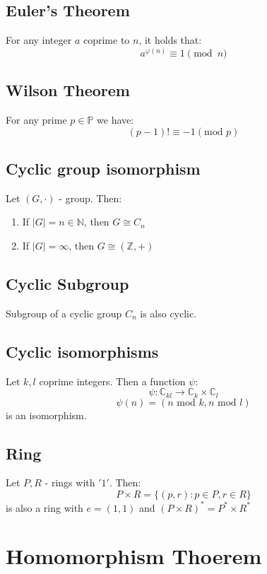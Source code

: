 \documentclass{article}
\begin{document}
\subsection{Euler's Theorem}

For any integer \( a \) coprime to \( n \), it holds that:
\[ a^{\varphi(n)} \equiv 1 \pmod{n} \]

\subsection{Wilson Theorem}

For any prime \(p\in\mathbb{P}\) we have:
\[
(p-1)! \equiv -1 (\text{mod } p)
\]

\subsection{Cyclic group isomorphism}

Let \((G,\cdot)\) - group. Then:
\begin{enumerate}
    \item If \(|G| = n\in\mathbb{N}\), then \(G \cong C_n\)
    \item If \(|G| = \infty\), then \(G \cong (\mathbb{Z},+)\)    
\end{enumerate}

\subsection{Cyclic Subgroup}

Subgroup of a cyclic group \(C_n\) is also cyclic. 

\subsection{Cyclic isomorphisms}

Let \(k, l\) coprime integers. Then a function \(\psi\):
\[
\psi: \mathbb{C}_{kl} \rightarrow \mathbb{C}_{k} \times \mathbb{C}_{l}
\]
\[
\psi(n) = (n \text{ mod } k, n \text{ mod } l)
\]
is an isomorphism.

\subsection{Ring }

Let \(P, R\) - rings with \('1'\). Then:
\[
P \times R = \{(p,r): p\in P, r\in R\}
\]
is also a ring with \(e=(1,1)\) and \((P\times R)^{*} = P^* \times R^*\)


\section{Homomorphism Thoerem}
\end{document}
